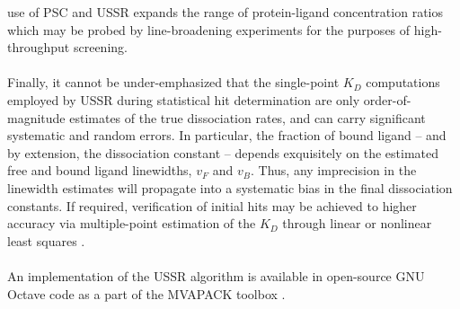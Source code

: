 \begin{doublespace}
use of PSC and USSR expands the range of protein-ligand concentration ratios
which may be probed by \hnmr{} line-broadening experiments for the purposes
of high-throughput screening.
\\\\
Finally, it cannot be under-emphasized that the single-point $K_D$ computations
employed by USSR during statistical hit determination are only
order-of-magnitude estimates of the true dissociation rates, and can carry
significant systematic and random errors. In particular, the fraction of bound
ligand -- and by extension, the dissociation constant -- depends exquisitely
on the estimated free and bound ligand linewidths, $v_F$ and $v_B$. Thus, any
imprecision in the linewidth estimates will propagate into a systematic bias in
the final dissociation constants. If required, verification of initial hits may
be achieved to higher accuracy via multiple-point estimation of the $K_D$
through linear or nonlinear least squares \cite{shortridge:jcomb2008}.
\\\\
An implementation of the USSR algorithm is available in open-source GNU Octave
code as a part of the MVAPACK toolbox \cite{worley:acscb2014}.
\end{doublespace}

